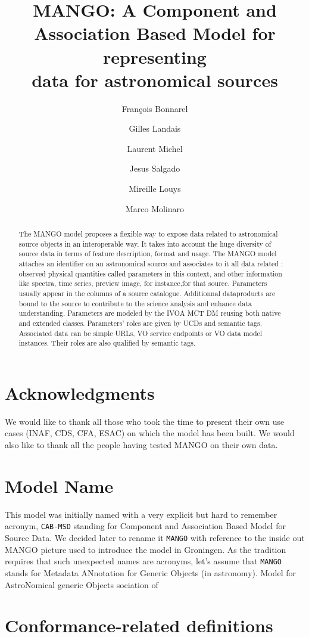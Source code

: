 \documentclass[11pt,a4paper]{ivoa}
\title{MANGO: A Component and Association Based Model for representing \\data for astronomical sources}
\author{François Bonnarel}
\author{Gilles Landais}
\author{Laurent Michel}
\author{Jesus Salgado}
\author{Mireille Louys}
\author{Marco Molinaro}
\begin{document}
\begin{abstract}
The MANGO model proposes a flexible way to expose data related to astronomical source objects in an interoperable way.
It takes into account the huge diversity of source data in terms of feature description, format and usage.
The MANGO model attaches an identifier on an astronomical source and associates to it all data related : observed physical quantities called parameters in this context, and other information like spectra, time series, preview image, for instance,for that source.
Parameters usually appear in the columns of a source catalogue. Additionnal dataproducts are bound to the source to contribute to the science analysis and enhance data understanding.
Parameters are modeled by the IVOA MCT DM reusing both native and extended classes. Parameters' roles are given by UCDs and semantic tags.
Associated data can be simple URLs, VO service endpoints or VO data model instances. Their roles are also qualified by semantic tags.

\end{abstract}


\section*{Acknowledgments}

We would like to thank all those who took the time to present their own use cases (INAF, CDS, CFA, ESAC) on which the model has been built.
We would also like to thank all the people having tested MANGO on their own data.

\section*{Model Name}
This model was initially named with a very explicit but hard to remember acronym, \texttt{CAB-MSD} standing for Component and Association Based Model for Source Data. We decided later to rename it \texttt{MANGO} with reference to the inside out MANGO picture used to introduce the model in Groningen. As the tradition requires that such unexpected names are acronyms, let's assume that \texttt{MANGO} stands for
Metadata ANnotation for Generic Objects (in astronomy).
Model for AstroNomical generic Objects sociation of


\section*{Conformance-related definitions}
\end{document}
